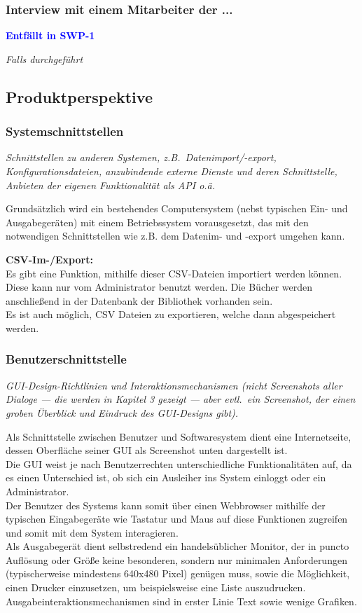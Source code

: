 \documentclass[fontsize=12pt,paper=a4,twoside]{scrartcl}
\newcommand{\highlight}[1]{\textcolor{blue}{\textbf{#1}}}
\newcommand{\nurlangversion}[0]{%
\ifthenelse{\boolean{langversion}}{\highlight{Muss in SWP-2 ausgefüllt werden}}
{\highlight{Entfällt in SWP-1}}}
\begin{document}
\subsubsection{Interview mit einem Mitarbeiter der ...}
\nurlangversion

{\em Falls durchgeführt}

\subsection{Produktperspektive}
  
\subsubsection{Systemschnittstellen}

  {\em Schnittstellen zu anderen Systemen, z.B.\ Datenimport/-export,
  Konfigurationsdateien, anzubindende externe Dienste und deren Schnittstelle,
  Anbieten der eigenen Funktionalität als API o.ä.}
  
  Grundsätzlich wird ein bestehendes Computersystem (nebst typischen Ein- und Ausgabegeräten) 
  mit einem Betriebssystem vorausgesetzt, das mit den notwendigen Schnittstellen wie z.B. dem 
  Datenim- und -export umgehen kann.
  
  \textbf{CSV-Im-/Export:}\\
  Es gibt eine Funktion, mithilfe dieser CSV-Dateien importiert werden können. Diese kann nur vom 
  Administrator benutzt werden. Die Bücher werden anschließend in der Datenbank der Bibliothek 
  vorhanden sein. \\
  Es ist auch möglich, CSV Dateien zu exportieren, welche dann abgespeichert werden.

\subsubsection{Benutzerschnittstelle}

  {\em GUI-Design-Richtlinien und Interaktionsmechanismen (nicht
  Screenshots aller Dialoge --- die werden in Kapitel 3 gezeigt --- aber
  evtl.\ ein Screenshot, der einen groben Überblick und Eindruck des
  GUI-Designs gibt).}

Als Schnittstelle zwischen Benutzer und Softwaresystem dient eine Internetseite, dessen Oberfläche 
seiner GUI als Screenshot unten dargestellt ist. \\
Die GUI weist je nach Benutzerrechten unterschiedliche Funktionalitäten auf, da es einen Unterschied ist, 
ob sich ein Ausleiher ins System einloggt oder ein Administrator. \\
Der Benutzer des Systems kann somit über einen Webbrowser mithilfe der typischen Eingabegeräte wie 
Tastatur und Maus auf diese Funktionen zugreifen und somit mit dem System interagieren. \\
Als Ausgabegerät dient selbstredend ein handelsüblicher Monitor, der in puncto Auflösung oder Größe 
keine besonderen, sondern nur minimalen Anforderungen (typischerweise mindestens 640x480 Pixel) 
genügen muss, sowie die Möglichkeit, einen Drucker einzusetzen, um beispielsweise eine Liste 
auszudrucken. \\
Ausgabeinteraktionsmechanismen sind in erster Linie Text sowie wenige Grafiken. 
\end{document}
